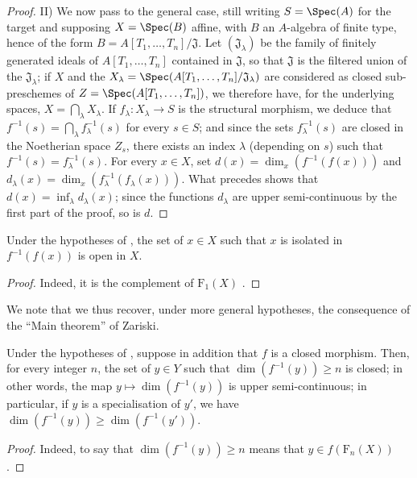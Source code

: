 \begin{proof}
II) We now pass to the general case, still writing $S=\Spec(A)$ for the target and supposing $X=\Spec(B)$ affine, with $B$ an $A$-algebra of finite type, hence of the form
$B=A[T_1,\ldots,T_n]/\mathfrak{J}$.
Let $(\mathfrak{J}_\lambda)$ be the family of finitely generated ideals of $A[T_1,\ldots,T_n]$ contained in $\mathfrak{J}$, so that $\mathfrak{J}$ is the filtered union of the $\mathfrak{J}_\lambda$; if $X$ and the $X_\lambda=\Spec(A[T_1,\ldots,T_n]/\mathfrak{J}_\lambda)$ are considered as closed sub-preschemes of $Z=\Spec(A[T_1,\ldots,T_n])$, we therefore have, for the underlying spaces, $X=\bigcap_\lambda X_\lambda$.
If $f_\lambda:X_\lambda\to S$ is the structural morphism, we deduce that $f^{-1}(s)=\bigcap_\lambda f_\lambda^{-1}(s)$ for every $s\in S$; and since the sets $f_\lambda^{-1}(s)$ are closed in the Noetherian space $Z_s$, there exists an index $\lambda$ (depending on $s$) such that $f^{-1}(s)=f_\lambda^{-1}(s)$.
For every $x\in X$, set $d(x)=\dim_x(f^{-1}(f(x)))$ and $d_\lambda(x)=\dim_x(f_\lambda^{-1}(f_\lambda(x)))$. What precedes shows that $d(x)=\inf_\lambda d_\lambda(x)$; since the functions $d_\lambda$ are upper semi-continuous by the first part of the proof, so is $d$.
\end{proof}

\begin{corollary}[13.1.4]
\label{IV.13.1.4}
Under the hypotheses of , the set of $x\in X$ such that $x$ is isolated in $f^{-1}(f(x))$ is open in $X$.
\end{corollary}

\begin{proof}
Indeed, it is the complement of $\mathrm{F}_1(X)$ .
\end{proof}

We note that we thus recover, under more general hypotheses, the consequence  of the ``Main theorem'' of Zariski.

\begin{corollary}[13.1.5]
\label{IV.13.1.5}
Under the hypotheses of , suppose in addition that $f$ is a closed morphism.
Then, for every integer $n$, the set of $y\in Y$ such that $\dim(f^{-1}(y))\geq n$ is closed; in other words, the map $y\mapsto\dim(f^{-1}(y))$ is upper semi-continuous; in particular, if $y$ is a specialisation of $y'$, we have $\dim(f^{-1}(y))\geq\dim(f^{-1}(y'))$.
\end{corollary}

\begin{proof}
Indeed, to say that $\dim(f^{-1}(y))\geq n$ means that $y\in f(\mathrm{F}_n(X))$ .
\end{proof}

